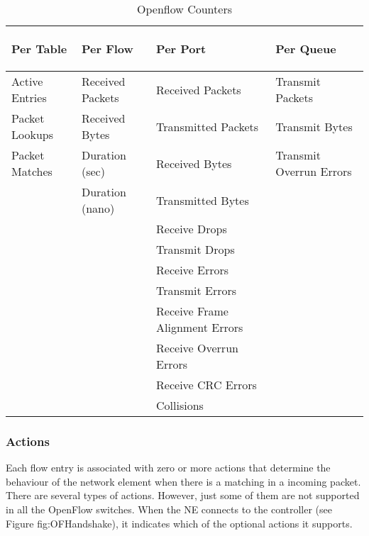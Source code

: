 \begin{table}[ht]
\caption{Openflow Counters}
\begin{tabular}{ | p{2.9cm} || p{3cm} || p{3.5cm} || p{4.2cm} | }
  \hline
 \begin{center} \textbf{Per Table} \end{center} & \begin{center} \textbf{Per Flow} \end{center} & \begin{center} \textbf{Per Port} \end{center} & \begin{center} \textbf{Per Queue}\end{center} \\ \hline  \hline   
  Active Entries & Received Packets & Received Packets & Transmit Packets   \\ \hline
  Packet Lookups & Received Bytes & Transmitted Packets & Transmit Bytes  \\ \hline
  Packet Matches & Duration (sec) & Received Bytes & Transmit Overrun Errors \\ \hline
   & Duration (nano) & Transmitted Bytes &  \\ \cline{2-3}
   & & Receive Drops &  \\ \cline{3-3}
   & & Transmit Drops &  \\ \cline{3-3}
   & & Receive Errors &  \\ \cline{3-3}
   & & Transmit Errors &  \\ \cline{3-3}
   & & Receive Frame Alignment Errors &  \\ \cline{3-3}
   & & Receive Overrun Errors &  \\  \cline{3-3} 
   & & Receive CRC Errors  &  \\ \cline{3-3}
   & & Collisions & \\    \hline
\end{tabular}
\label{table:counters}
\end{table}


\subsubsection{Actions}

Each flow entry is associated with zero or more actions that determine the behaviour of the network element when there is a matching in a incoming packet. There are several types of actions. However, just some of them are not supported in all the OpenFlow switches. When the NE connects to the controller (see Figure fig:OFHandshake), it indicates which of the optional actions it supports. \\

